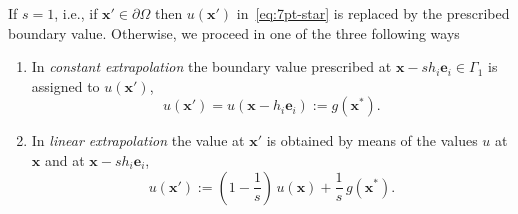 \documentclass[a4paper,10pt,3p,final,pdftex]{elsarticle}
\begin{document}
If $s=1$, i.e., if $\mathbf{x}'\in \partial\Omega$ then $u(\mathbf{x}')$
in~\eqref{eq:7pt-star} is replaced by the prescribed boundary value.
Otherwise, we proceed in one of the three following ways~\cite{fowa:60,
  hack:94}
\begin{enumerate}
\item In \emph{constant extrapolation} the boundary value prescribed at
  $\mathbf{x} - s h_i\mathbf{e}_i \in \Gamma_1$ is assigned to
  $u(\mathbf{x}')$,
  \begin{equation}
    \label{eq:const_extrapol}
    u(\mathbf{x}') = u(\mathbf{x} - h_i\mathbf{e}_i) := g(\mathbf{x}^*).
  \end{equation}
\item In \emph{linear extrapolation} the value at $\mathbf{x}'$ is
  obtained by means of the values $u$ at $\mathbf{x}$ and at $\mathbf{x}
  - sh_i\mathbf{e}_i$,
  \begin{equation}
    \label{eq:lin_extrapol}
    u(\mathbf{x}') := (1-\frac{1}{s})\, u(\mathbf{x}) + \frac{1}{s}\,
    g(\mathbf{x}^*).
  \end{equation}


\end{enumerate}
\end{document}
